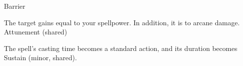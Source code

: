 \begin{spellsection}{Barrier}
\begin{spellheader}
\end{spellheader}
\begin{spellcontent}
\begin{spelltargetinginfo}
\end{spelltargetinginfo}
\begin{spelleffects}
\spelleffect
The target gains  equal to your spellpower.
In addition, it is  to arcane damage.
\spelldur Attunement (shared)
\end{spelleffects}
\end{spellcontent}
\begin{spellfooter}
\end{spellfooter}
\begin{spellsubcontent}
\begin{spellcantrip}
The spell's casting time becomes a standard action, and its duration becomes Sustain (minor, shared).
\end{spellcantrip}
\end{spellsubcontent}
\end{spellsection}
